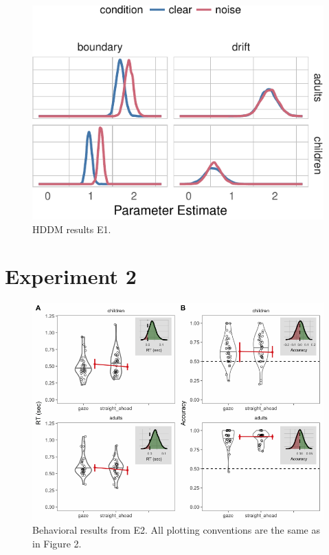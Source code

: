 \documentclass[10pt, letterpaper]{article}
\newenvironment{CodeChunk}{}{}
\begin{document}
\begin{CodeChunk}
\begin{figure}[t]

{\centering \includegraphics[width=0.8\linewidth]{figs/hddm_plot_noise-1} 

}

\caption[HDDM results E1]{HDDM results E1.}\label{fig:hddm_plot_noise}
\end{figure}
\end{CodeChunk}

\section{Experiment 2}\label{experiment-2}

\begin{CodeChunk}
\begin{figure}[t]

{\centering \includegraphics[width=0.8\linewidth]{figs/gaze_acc_rt_e2_plot-1} 

}

\caption[Behavioral results from E2]{Behavioral results from E2. All plotting conventions are the same as in Figure 2.}\label{fig:gaze_acc_rt_e2_plot}
\end{figure}
\end{CodeChunk}
\end{document}
